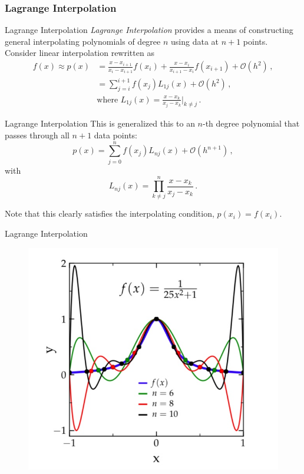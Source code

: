 \documentclass[11pt]{beamer}
\begin{document}
\subsubsection{Lagrange Interpolation}
\begin{frame}[fragile]{Lagrange Interpolation}
\emph{Lagrange Interpolation} provides a means of constructing
general interpolating polynomials of degree $n$ using data at $n+1$
points.\\

\pause
Consider linear interpolation rewritten as
\begin{equation}
\begin{aligned}
f(x) \approx p(x) & = \frac{x-x_{i+1}}{x_i - x_{i+1}} f(x_i) +
\frac{x-x_i}{x_{i+1}-x_i} f(x_{i+1}) + \mathcal{O}(h^2)\,,\\
  & = \sum_{j=i}^{i+1} f(x_j) L_{1j}(x) + \mathcal{O}(h^2)\,,\\
& \text{where}\,\, L_{1j}(x) = \frac{x-x_k}{x_j-x_k}\bigg|_{k\ne j}\,.
\end{aligned}
\end{equation}
\end{frame}

\begin{frame}[fragile]{Lagrange Interpolation}
This is generalized this to an $n$-th degree polynomial that
passes through all $n+1$ data points:
\begin{equation}
p(x) = \sum_{j=0}^{n} f(x_j) L_{nj}(x) + \mathcal{O}(h^{n+1})\,,
\end{equation}
with
\begin{equation}
L_{nj}(x) = \prod_{k\ne j}^{n} \frac{x-x_k}{x_j - x_k}\,.
\end{equation}

Note that this clearly satisfies the interpolating condition,
$p(x_i) = f(x_i)$.

\end{frame}

\begin{frame}[fragile]{Lagrange Interpolation}
\begin{figure}
\includegraphics[scale=0.3]{interpolationExample.jpeg}
\end{figure}

\end{frame}
\end{document}
